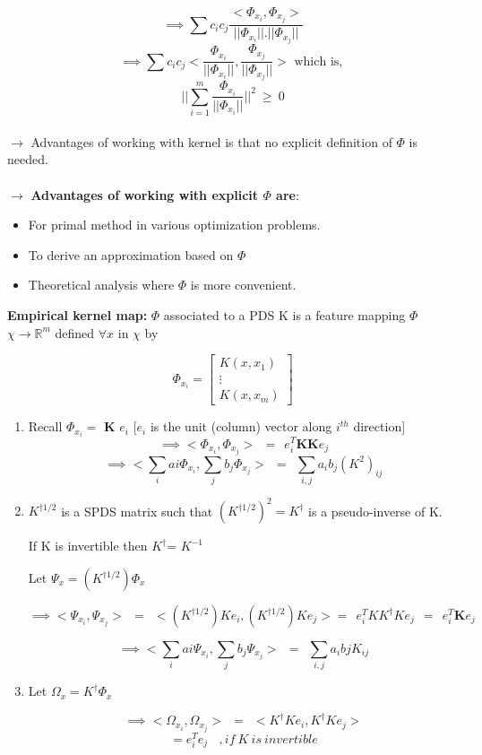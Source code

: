 \documentclass{article}
\begin{document}
	$$\implies\sum c_ic_j\frac{<\Phi_{x_i},\Phi_{x_j}>}{||\Phi_{x_i}||.||\Phi_{x_j}||}$$
	$$\implies\sum c_ic_j<\frac{\Phi_{x_i}}{||\Phi_{x_i}||},\frac{\Phi_{x_j}}{||\Phi_{x_j}||}> \text{ which is, }$$
	$$||\sum_{i=1}^{m}\frac{\Phi_{x_i}}{||\Phi_{x_i}||}||^2~\geq~0$$
	\\
	$\rightarrow$ Advantages of working with kernel is that no explicit definition of $\Phi$ is needed.\\\\
	$\rightarrow$ \textbf{Advantages of working with explicit $\Phi$ are}:
	\begin{itemize}
		\item For primal method in various optimization problems.
		\item To derive an approximation based on $\Phi$
		\item Theoretical analysis where $\Phi$ is more convenient.
	\end{itemize}
	\textbf{Empirical kernel map:}
	$\Phi$ associated to a PDS K is a feature mapping $\Phi$  $\chi \rightarrow  \mathbb{R}^m $ defined $\forall x$ in $\chi $ by
	
	$$ \Phi_{x_i}= \left[\begin{array}{ccc} K(x,x_1) \\ \vdots \\  K(x,x_m) \end{array} \right ] $$
	
	\begin{enumerate}
		\item 
		Recall $\Phi_{x_i} =$ \textbf{K} $e_i$ [$e_i$ is the unit (column) vector along $i^{th}$ direction]
		$$\implies <\Phi_{x_i},\Phi_{x_j}>~~=~~e_i^T  \textbf{K}\textbf{K} e_j $$
		$$\implies <\sum_{i} a{i}\Phi_{x_i}, \sum_{j} b_{j}\Phi_{x_j}> ~~=~~\sum_{i,j} a_{i} b_{j} (K^{2})_{ij} $$
		
		\item 
		$K^{\dagger1/2}$ is a SPDS matrix such that ${(K^{\dagger1/2})}^{2}= K^{\dagger}$ is a pseudo-inverse of K.
		
		If K is invertible then $K^{\dagger}$= $K^{-1}$
		
		Let $\Psi_{x} = (K^{\dagger1/2}) \Phi_x$
		
		$$ \implies <\Psi_{x_i},\Psi_{x_j}>~~=~~< (K^{\dagger1/2})Ke_{i},(K^{\dagger1/2})Ke_{j}>
		=~~e_i^T  KK^{\dagger}K e_j~~=~~e_i^T  \textbf{K} e_j $$
		
		$$\implies <\sum_{i} a{i}\Psi_{x_i}, \sum_{j} b_{j}\Psi_{x_j}> ~~=~~\sum_{i,j} a_{i} b{j} K_{ij} $$
		
		\item 
		Let $\Omega_{x} = K^{\dagger} \Phi_x$
		
		$$ \implies <\Omega_{x_{i}}, \Omega_{x_{j}}>~~=~~ <K^{\dagger}Ke_{i}, K^{\dagger}Ke_{j}>$$
		$$= e_{i}^{T}e_{j}~~~~,if ~K~is ~invertible  $$
	\end{enumerate}
	
\end{document}
